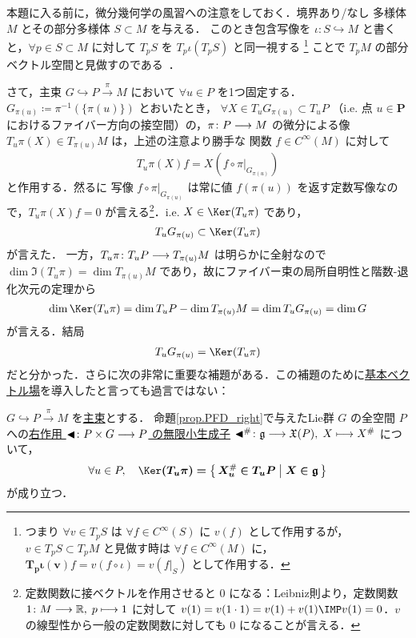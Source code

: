 \documentclass[TQFT_main]{subfiles}
\begin{document}
本題に入る前に，微分幾何学の風習への注意をしておく．境界あり/なし \cinfty 多様体 $M$ とその部分多様体 $S \subset M$ を与える．
このとき包含写像を $\iota \colon S \hookrightarrow M$ と書くと，$\forall p \in S \subset M$ に対して $T_p S$ を $T_p \iota (T_p S)$ と同一視する
\footnote{
    つまり $\forall v \in T_p S$ は $\forall f \in C^\infty (S)$ に $v(f)$ として作用するが，$v \in T_p S \subset T_p M$ と見做す時は $\forall f \in C^\infty (M)$ に，$\bm{T_p \iota(v)}f = v(f \circ \iota) = v(f|_S)$ として作用する．
}
ことで $T_p M$ の部分ベクトル空間と見做すのである~\cite[p.116]{Lee2012smooth}．

さて，主束 $G \hookrightarrow P \xrightarrow{\pi} M$ において $\forall u \in P$ を1つ固定する．
$G_{\pi(u)} \coloneqq \pi^{-1}(\{\pi(u)\})$ とおいたとき，
$\forall X \in T_u G_{\pi(u)} \subset T_u P$ （i.e. 点 $u \in \bm{P}$ におけるファイバー方向の接空間）の，$\pi \colon P \longrightarrow M$ の微分による像 $T_u \pi (X) \in T_{\pi(u)} M$ は，上述の注意より勝手な \cinfty 関数 $f \in C^\infty (M)$ に対して
\begin{align}
    T_u \pi (X)f = X(f \circ \pi|_{G_{\pi(u)}})
\end{align}
と作用する．然るに \cinfty 写像 $f \circ \pi|_{G_{\pi(u)}}$ は常に値 $f(\pi(u))$ を返す定数写像なので，$T_u \pi (X)f = 0$ が言える\footnote{定数関数に接ベクトルを作用させると $0$ になる：Leibniz則より，定数関数 $1 \colon M \longrightarrow \mathbb{R},\;p \longmapsto 1$ に対して $v(1) = v(1\cdot 1) = v(1) + v(1) \IMP v(1) = 0$．$v$ の線型性から一般の定数関数に対しても $0$ になることが言える．}．i.e. $X \in \Ker (T_u \pi)$ であり，
\begin{align}
    T_u G_{\pi(u)} \subset \Ker (T_u \pi)
\end{align}
が言えた．
一方，$T_u \pi \colon T_u P \longrightarrow T_{\pi(u)} M$ は明らかに全射なので $\dim \Im (T_u \pi) = \dim T_{\pi(u)} M$ であり，故にファイバー束の局所自明性と階数-退化次元の定理から
\begin{align}
    \label{eq:dim}
    \dim \Ker (T_u \pi) = \dim T_u P - \dim T_{\pi(u)} M = \dim T_u G_{\pi(u)} = \dim G
\end{align}
が言える．結局
\begin{align}
    \label{eq:tangent-fiber}
    T_u G_{\pi(u)} = \Ker (T_u \pi)
\end{align}
だと分かった．さらに次の非常に重要な補題がある．この補題のために\hyperref[def:fundamental-vecf]{基本ベクトル場}を導入したと言っても過言ではない：
\begin{mylem}[label=lem:connection]{}
    $G \hookrightarrow P \xrightarrow{\pi} M$ を\hyperref[def.PFD]{主束}とする．
    命題\ref{prop.PFD_right}で与えたLie群 $G$ の全空間 $P$ への\hyperref[def:fundamental-vecf]{右作用 $\blacktriangleleft \colon P \times G \longrightarrow P$ の無限小生成子} $\blacktriangleleft^\# \colon \mathfrak{g} \longrightarrow \mathfrak{X}(P),\; X \longmapsto X^\#$ について，
    \begin{align}
        \forall u \in P,\quad \bm{\Ker (T_{u} \pi) = \bigl\{\, X^\#_{u} \in T_{u} P \bigm| X \in \mathfrak{g} \,\bigr\}}
    \end{align}
    が成り立つ．
\end{mylem}
\end{document}
